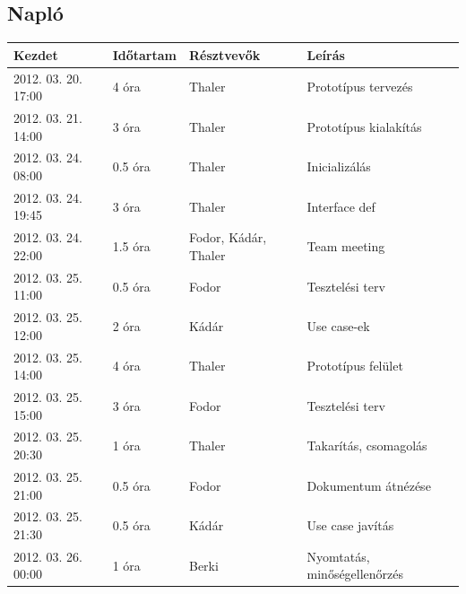	\subsection{Napló}
    \begin{center} 
        \begin{tabular}{| l | p{1.9cm} | p{2.6cm} | p{6.1cm} |}
            \hline
                Kezdet & Időtartam & Résztvevők & Leírás \\
            \hline \hline 
2012. 03. 20. 17:00 & 4 óra & Thaler & Prototípus tervezés\\ \hline
2012. 03. 21. 14:00 & 3 óra & Thaler & Prototípus kialakítás\\ \hline
2012. 03. 24. 08:00 & 0.5 óra & Thaler & Inicializálás\\ \hline
2012. 03. 24. 19:45 & 3 óra & Thaler & Interface def\\ \hline
2012. 03. 24. 22:00 & 1.5 óra & Fodor, Kádár, Thaler & Team meeting\\ \hline
2012. 03. 25. 11:00 & 0.5 óra & Fodor & Tesztelési terv\\ \hline
2012. 03. 25. 12:00 & 2 óra & Kádár & Use case-ek\\ \hline
2012. 03. 25. 14:00 & 4 óra & Thaler & Prototípus felület\\ \hline
2012. 03. 25. 15:00 & 3 óra & Fodor & Tesztelési terv\\ \hline
2012. 03. 25. 20:30 & 1 óra & Thaler & Takarítás, csomagolás\\ \hline
2012. 03. 25. 21:00 & 0.5 óra & Fodor & Dokumentum átnézése\\ \hline
2012. 03. 25. 21:30 & 0.5 óra & Kádár & Use case javítás\\ \hline
2012. 03. 26. 00:00 & 1 óra & Berki & Nyomtatás, minőségellenőrzés\\ \hline

            \hline
        \end{tabular}
    \end{center}

